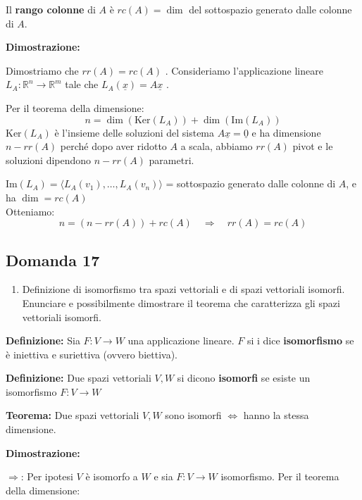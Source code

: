 \documentclass[
  a4paper,
]{article}
\providecommand{\tightlist}{%
  \setlength{\itemsep}{0pt}\setlength{\parskip}{0pt}}
\providecommand{\tightlist}{}
\begin{document}
Il \textbf{rango colonne} di \(A\) è \(rc(A) = \dim\) del sottospazio
generato dalle colonne di \(A\).

\textbf{Dimostrazione:}

Dimostriamo che \(rr(A) = rc(A)\) . Consideriamo l'applicazione lineare
\(L_A : \mathbb{R}^n \to \mathbb{R}^m\) tale che
\(L_A (\underline{x}) = A\underline{x}\) .

Per il teorema della dimensione: \[
n = \dim(\text{Ker} (L_A)) + \dim(\text{Im} (L_A))
\] \(\text{Ker}(L_A)\) è l'insieme delle soluzioni del sistema
\(A\underline{x} = \underline{0}\) e ha dimensione \(n - rr(A)\) perché
dopo aver ridotto \(A\) a scala, abbiamo \(rr(A)\) pivot e le soluzioni
dipendono \(n - rr(A)\) parametri.

\(\text{Im}(L_A) = \langle L_A(v_1), \dots , L_A(v_n) \rangle\) =
sottospazio generato dalle colonne di \(A\), e ha \(\dim = rc(A)\)\\
Otteniamo: \[
n = (n -rr(A)) + rc(A) \quad \Rightarrow \quad rr(A) = rc(A)
\]

\hypertarget{domanda-17}{%
\subsection{Domanda 17}\label{domanda-17}}

\begin{observationbox}[Domanda]
\begin{enumerate}
\def\labelenumi{\arabic{enumi}.}
\setcounter{enumi}{16}
\tightlist
\item
  Definizione di isomorfismo tra spazi vettoriali e di spazi vettoriali
  isomorfi. Enunciare e possibilmente dimostrare il teorema che
  caratterizza gli spazi vettoriali isomorfi.
\end{enumerate}
\end{observationbox}

\textbf{Definizione:} Sia \(F : V \to W\) una applicazione lineare.
\(F\) si i dice \textbf{isomorfismo} se è iniettiva e suriettiva (ovvero
biettiva).

\textbf{Definizione:} Due spazi vettoriali \(V, W\) si dicono
\textbf{isomorfi} se esiste un isomorfismo \(F: V \to W\)

\textbf{Teorema:} Due spazi vettoriali \(V, W\) sono isomorfi \(\iff\)
hanno la stessa dimensione.

\textbf{Dimostrazione:}

\(\Rightarrow\): Per ipotesi \(V\) è isomorfo a \(W\) e sia
\(F: V \to W\) isomorfismo. Per il teorema della dimensione:
\end{document}
